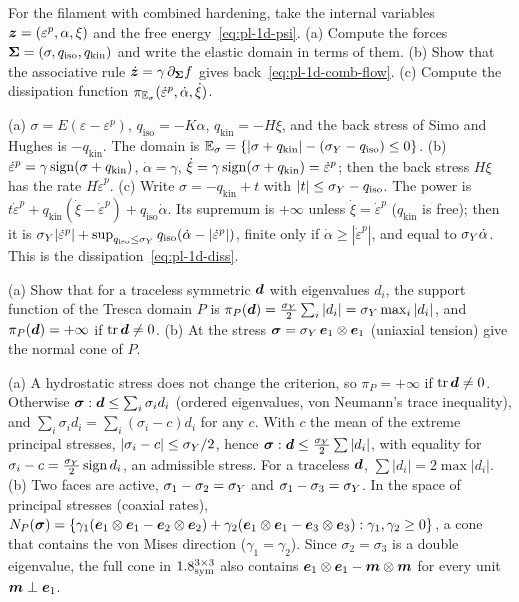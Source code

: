 \label{exo:pl-gsm1d}
For the filament with combined hardening, take the internal variables
$\bm{z}=(\varepsilon^p,\alpha,\xi)$ and the free energy~\eqref{eq:pl-1d-psi}.
(a) Compute the forces $\bm{\Sigma}=(\sigma,q_{\mathrm{iso}},q_{\mathrm{kin}})$ and
write the elastic domain in terms of them. (b) Show that the associative rule
$\dot{\bm{z}}=\gamma\,\partial_{\bm{\Sigma}}f$ gives back~\eqref{eq:pl-1d-comb-flow}.
(c) Compute the dissipation function $\pi_{\mathbb{E}_{\sigma}}(\dot\varepsilon^p,\dot\alpha,\dot\xi)$.
\begin{solution}
(a) $\sigma=E(\varepsilon-\varepsilon^p)$, $q_{\mathrm{iso}}=-K\alpha$,
$q_{\mathrm{kin}}=-H\xi$, and the back stress of Simo and Hughes is
$-q_{\mathrm{kin}}$. The domain is
$\mathbb{E}_{\sigma}=\{|\sigma+q_{\mathrm{kin}}|-(\sigma_{Y}-q_{\mathrm{iso}})\le0\}$.
(b) $\dot\varepsilon^p=\gamma\operatorname{sign}(\sigma+q_{\mathrm{kin}})$, $\dot\alpha=\gamma$,
$\dot\xi=\gamma\operatorname{sign}(\sigma+q_{\mathrm{kin}})=\dot\varepsilon^p$; then the back
stress $H\xi$ has the rate $H\dot\varepsilon^p$.
(c) Write $\sigma=-q_{\mathrm{kin}}+t$ with $|t|\le\sigma_{Y}-q_{\mathrm{iso}}$. The
power is $t\dot\varepsilon^p+q_{\mathrm{kin}}(\dot\xi-\dot\varepsilon^p)+q_{\mathrm{iso}}\dot\alpha$.
Its supremum is $+\infty$ unless $\dot\xi=\dot\varepsilon^p$ ($q_{\mathrm{kin}}$
is free); then it is $\sigma_{Y}|\dot\varepsilon^p|+\sup_{q_{\mathrm{iso}}\le\sigma_{Y}}q_{\mathrm{iso}}(\dot\alpha-|\dot\varepsilon^p|)$,
finite only if $\dot\alpha\ge|\dot\varepsilon^p|$, and equal to $\sigma_{Y}\dot\alpha$.
This is the dissipation~\eqref{eq:pl-1d-diss}.
\end{solution}

\label{exo:pl-tresca}
%
(a) Show that for a traceless symmetric $\bm{d}$ with eigenvalues $d_i$, the
support function of the Tresca domain $P$ is
$\pi_P(\bm{d})=\tfrac{\sigma_{Y}}{2}\sum_i|d_i|=\sigma_{Y}\max_i|d_i|$, and
$\pi_P(\bm{d})=+\infty$ if $\operatorname{tr}\bm{d}\ne0$.
(b) At the stress $\bm{\sigma}=\sigma_{Y}\,\bm{e}_1\otimes\bm{e}_1$ (uniaxial tension) give the
normal cone of $P$.
\begin{solution}
(a) A hydrostatic stress does not change the criterion, so $\pi_P=+\infty$ if
$\operatorname{tr}\bm{d}\ne0$. Otherwise $\bm{\sigma}:\bm{d}\le\sum_i\sigma_id_i$ (ordered
eigenvalues, von Neumann's trace inequality), and
$\sum_i\sigma_id_i=\sum_i(\sigma_i-c)d_i$ for any $c$. With $c$ the mean of
the extreme principal stresses, $|\sigma_i-c|\le\sigma_{Y}/2$, hence
$\bm{\sigma}:\bm{d}\le\tfrac{\sigma_{Y}}{2}\sum|d_i|$, with equality for
$\sigma_i-c=\tfrac{\sigma_{Y}}2\operatorname{sign} d_i$, an admissible stress. For a traceless
$\bm{d}$, $\sum|d_i|=2\max|d_i|$.
(b) Two faces are active, $\sigma_1-\sigma_2=\sigma_{Y}$ and $\sigma_1-\sigma_3=\sigma_{Y}$. In
the space of principal stresses (coaxial rates),
$N_P(\bm{\sigma})=\{\gamma_1(\bm{e}_1\otimes\bm{e}_1-\bm{e}_2\otimes\bm{e}_2)+\gamma_2(\bm{e}_1\otimes\bm{e}_1-\bm{e}_3\otimes\bm{e}_3):\gamma_1,\gamma_2\ge0\}$,
a cone that contains the von Mises direction ($\gamma_1=\gamma_2$). Since
$\sigma_2=\sigma_3$ is a double eigenvalue, the full cone in $1.8^{3\times3}_{\mathrm{sym}}$ also contains
$\bm{e}_1\otimes\bm{e}_1-\bm{m}\otimes\bm{m}$ for every unit $\bm{m}\perp\bm{e}_1$.
\end{solution}

